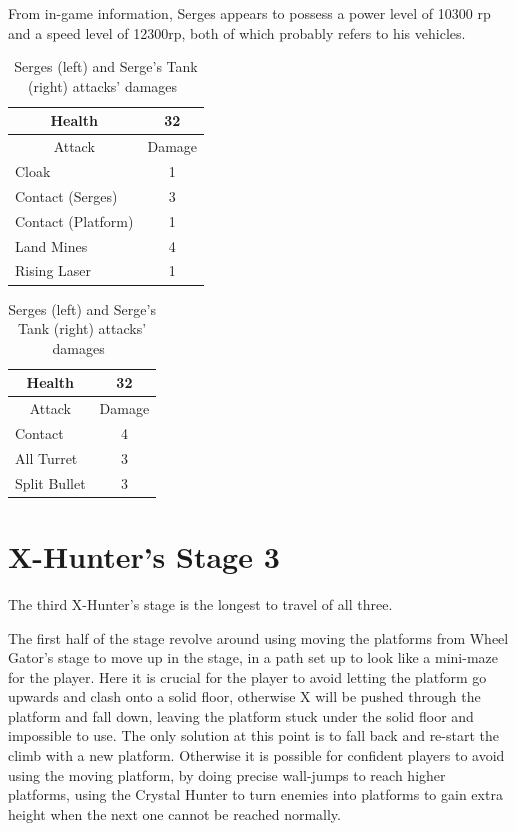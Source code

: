 From in-game information, Serges appears to possess a power level of 10300 rp and a speed level of 12300rp, both of which probably refers to his vehicles.

\begin{table}[htp]
	\begin{minipage}{.45\linewidth}
		\centering
		\begin{tabular}[h]{l c }
			\toprule
			\multicolumn{1}{c}{Health}  & 32 \\
			\midrule
			\multicolumn{1}{c}{Attack} & \multicolumn{1}{c}{Damage}\\
			Cloak & 1 \\
			Contact (Serges)& 3\\
			Contact (Platform)& 1\\
			Land Mines & 4\\
			Rising Laser& 1\\
			\bottomrule
		\end{tabular}
	\end{minipage}
	\begin{minipage}{.45\linewidth}
		\centering
		\begin{tabular}[h]{l c }
			\toprule
			\multicolumn{1}{c}{Health}  & 32 \\
			\midrule
			\multicolumn{1}{c}{Attack} & \multicolumn{1}{c}{Damage}\\
			Contact & 4 \\
			All Turret & 3\\
			Split Bullet & 3\\
			\bottomrule
		\end{tabular}
	\end{minipage}
	\caption{Serges (left) and Serge's Tank (right) attacks' damages~\cite{wiki:Serges}}
\end{table}


\section{X-Hunter's Stage 3}
The third X-Hunter's stage is the longest to travel of all three.

The first half of the stage revolve around using moving the platforms from Wheel Gator's stage to move up in the stage, in a path set up to look like a mini-maze for the player. Here it is crucial for the player to avoid letting the platform go upwards and clash onto a solid floor, otherwise X will be pushed through the platform and fall down, leaving the platform stuck under the solid floor and impossible to use. The only solution at this point is to fall back and re-start the climb with a new platform. Otherwise it is possible for confident players to avoid using the moving platform, by doing precise wall-jumps to reach higher platforms, using the Crystal Hunter to turn enemies into platforms to gain extra height when the next one cannot be reached normally.

